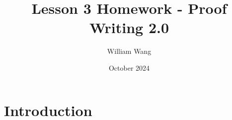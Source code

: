 \documentclass{article}
\title{Lesson 3 Homework - Proof Writing 2.0}
\author{William Wang}
\date{October 2024}
\begin{document}
\maketitle

\section{Introduction}
\end{document}
